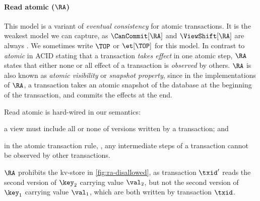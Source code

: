 \paragraph{Read atomic (\(\RA\))}
This model \citep{ramp} is
a variant of \emph{eventual consistency} \citep{ev_transactions} for atomic transactions.
It is the weakest model we can capture, as \(\CanCommit[\RA] \) and \( \ViewShift[\RA] \) are always \true.
We sometimes write \( \TOP \) or \( \et[\TOP] \) for this model.
In contrast to \emph{atomic} in ACID \citep{acid} stating that a transaction \emph{takes effect} in one atomic step, 
\( \RA \) states that either none or all effect of a transaction is \emph{observed} by others.
\( \RA \) is also known as \emph{atomic visibility} or \emph{snapshot property}, 
since in the implementations of \(\RA\),
a transaction takes an atomic snapshot of the database at the beginning of the transaction,
and commits the effects at the end.

Read atomic is hard-wired in our semantics:
\begin{enumerate*} \item a view must include all or none of versions written by a transaction; and
\item in the atomic transaction rule, \rCAtomicTrans,
any intermediate steps of a transaction cannot be observed by other transactions.
\end{enumerate*}
\( \RA \) prohibits the kv-store in \cref{fig:ra-disallowed},
as transaction \( \txid' \) reads the second version of \( \key_2 \) carrying value \( \val_2 \),
but not the second version of \( \key_1 \) carrying value \( \val_1 \), 
which are both written by transaction \( \txid \).


